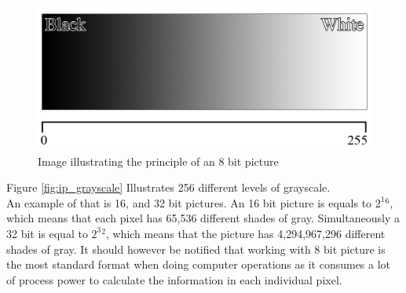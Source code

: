 \begin{figure}[htbp]
\centering
\includegraphics[width=1.00\textwidth]{Pictures/Theory/Grayscale.jpg}
\caption{Image illustrating the principle of an 8 bit picture}
\label{fig:ip_grayscale}
\end{figure}
Figure \eqref{fig:ip_grayscale} Illustrates 256 different levels of grayscale.\\

An example of that is 16, and 32 bit pictures. An 16 bit picture is equals to $2^1$$^6$, which means that each pixel has 65,536 different shades of gray. Simultaneously a 32 bit is equal to $2^3$$^2$, which means that the picture has 4,294,967,296 different shades of gray. It should however be notified that working with 8 bit picture is the most standard format when doing computer operations as it consumes a lot of process power to calculate the information in each individual pixel.
 
